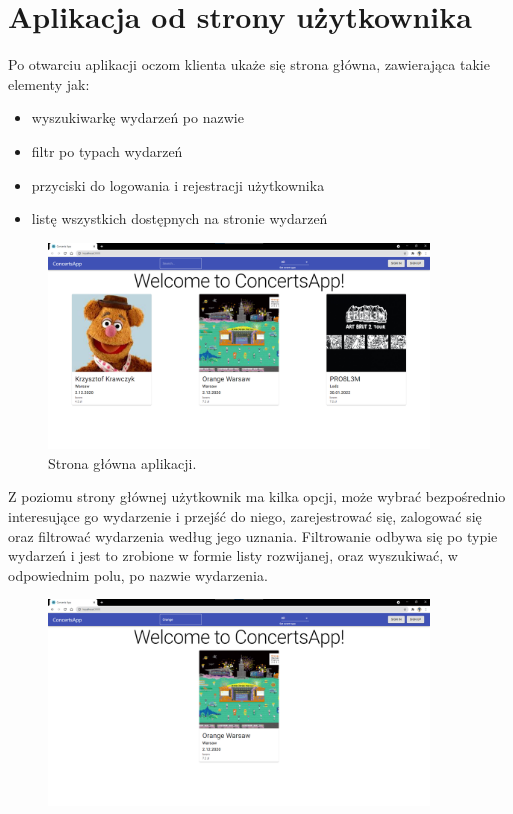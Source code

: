 \documentclass[12pt]{article}
\begin{document}
\begin{sloppypar}
\section{Aplikacja od strony użytkownika}
{
  Po otwarciu aplikacji oczom klienta ukaże się strona główna, zawierająca takie elementy jak:
  \begin{itemize}
    \item wyszukiwarkę wydarzeń po nazwie
    \item filtr po typach wydarzeń
    \item przyciski do logowania i rejestracji użytkownika
    \item listę wszystkich dostępnych na stronie wydarzeń
  \end{itemize}
  \begin{figure}[H]
    \centering
    \includegraphics[width=0.9\textwidth]{client_app/home.png}
    \caption{Strona główna aplikacji.}
    \label{fig:home-page}
  \end{figure}
  Z poziomu strony głównej użytkownik ma kilka opcji, może wybrać bezpośrednio interesujące go wydarzenie i przejść do niego, zarejestrować się, 
  zalogować się oraz filtrować wydarzenia według jego uznania. 
  Filtrowanie odbywa się po typie wydarzeń i jest to zrobione w formie listy rozwijanej, oraz wyszukiwać, w odpowiednim polu, po nazwie wydarzenia.
  \begin{figure}[H]
    \centering
    \includegraphics[width=0.9\textwidth]{client_app/search.png}

\end{figure}}
\end{sloppypar}
\end{document}
